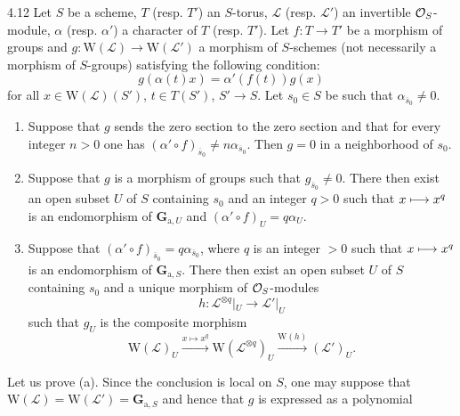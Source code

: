 \begin{proposition}{4.12}\label{XIX.4.12}
Let $S$ be a scheme, $T$ (resp. $T'$) an $S$-torus, $\mathcal L$ (resp. $\mathcal L'$) an invertible $\mathcal{O}_S$-module, $\alpha$ (resp. $\alpha'$) a character of $T$ (resp. $T'$).{\renewcommand{\thefootnote}{(37)}} Let $f:T\to T'$ be a morphism of groups and $g:\mathrm W(\mathcal L)\to\mathrm W(\mathcal L')$ a morphism of $S$-schemes (not necessarily a morphism of $S$-groups) satisfying the following condition:
\begin{equation}\tag{$\star$}\label{XIX.eq.star}
g(\alpha(t)x)=\alpha'(f(t))g(x)
\end{equation}
for all $x\in\mathrm W(\mathcal L)(S')$, $t\in T(S')$, $S'\to S$. Let $s_0\in S$ be such that $\alpha_{\overline{s}_0}\ne0$.
\begin{enumerate}[label=\textup{\alph*)}]
\item Suppose that $g$ sends the zero section to the zero section and that for every integer $n>0$ one has $(\alpha'\circ f)_{\overline{s}_0}\ne n\alpha_{\overline{s}_0}$. Then $g=0$ in a neighborhood of $s_0$.
\item Suppose that $g$ is a morphism of groups such that $g_{\overline{s}_0}\ne0$. There then exist an open subset $U$ of $S$ containing $s_0$ and an integer $q>0$ such that $x\longmapsto x^q$ is an endomorphism of $\mathbf{G}_{\mathrm a,U}$ and $(\alpha'\circ f)_U=q\alpha_U$.
\item Suppose that $(\alpha'\circ f)_{\overline{s}_0}=q\alpha_{\overline{s}_0}$, where $q$ is an integer $>0$ such that $x\longmapsto x^q$ is an endomorphism of $\mathbf{G}_{\mathrm a,S}$. There then exist an open subset $U$ of $S$ containing $s_0$ and a unique morphism of $\mathcal{O}_S$-modules
\[
h:\mathcal L^{\otimes q}|_U\to\mathcal L'|_U
\]
such that $g_U$ is the composite morphism
\[
\mathrm W(\mathcal L)_U\xrightarrow{x\mapsto x^q}\mathrm W(\mathcal L^{\otimes q})_U\xrightarrow{\mathrm W(h)}(\mathcal L')_U.
\]
\end{enumerate}
\end{proposition}
Let us prove (a). Since the conclusion is local on $S$, one may suppose that $\mathrm W(\mathcal L)=\mathrm W(\mathcal L')=\mathbf{G}_{\mathrm a,S}$ and hence that $g$ is expressed as a polynomial
